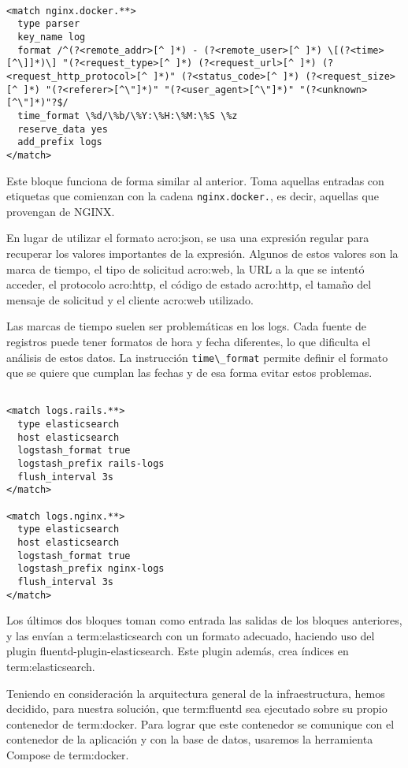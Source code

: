 \begin{lstlisting}

<match nginx.docker.**>
  type parser
  key_name log
  format /^(?<remote_addr>[^ ]*) - (?<remote_user>[^ ]*) \[(?<time>[^\]]*)\] "(?<request_type>[^ ]*) (?<request_url>[^ ]*) (?<request_http_protocol>[^ ]*)" (?<status_code>[^ ]*) (?<request_size>[^ ]*) "(?<referer>[^\"]*)" "(?<user_agent>[^\"]*)" "(?<unknown>[^\"]*)"?$/
  time_format \%d/\%b/\%Y:\%H:\%M:\%S \%z
  reserve_data yes
  add_prefix logs
</match>

\end{lstlisting}

Este bloque funciona de forma similar al anterior. Toma aquellas entradas con
etiquetas que comienzan con la cadena \lstinline{nginx.docker.}, es decir, aquellas que
provengan de NGINX.

En lugar de utilizar el formato \gls{acro:json}, se usa una expresión regular para
recuperar los valores importantes de la expresión. Algunos de estos valores son
la marca de tiempo, el tipo de solicitud \gls{acro:web}, la URL a la que se intentó
acceder, el protocolo \gls{acro:http}, el código de estado \gls{acro:http}, el tamaño del mensaje de
solicitud y el cliente \gls{acro:web} utilizado.

Las marcas de tiempo suelen ser problemáticas en los logs. Cada fuente de
registros puede tener formatos de hora y fecha diferentes, lo que dificulta el
análisis de estos datos. La instrucción \lstinline{time\_format} permite definir el formato
que se quiere que cumplan las fechas y de esa forma evitar estos problemas.

\begin{lstlisting}
 
<match logs.rails.**>
  type elasticsearch
  host elasticsearch
  logstash_format true
  logstash_prefix rails-logs
  flush_interval 3s
</match>

<match logs.nginx.**>
  type elasticsearch
  host elasticsearch
  logstash_format true
  logstash_prefix nginx-logs
  flush_interval 3s
</match>

\end{lstlisting}

Los últimos dos bloques toman como entrada las salidas de los bloques
anteriores, y las envían a \gls{term:elasticsearch} con un formato adecuado, haciendo uso
del plugin fluentd-plugin-elasticsearch. Este plugin además, crea índices en
\gls{term:elasticsearch}.

Teniendo en consideración la arquitectura general de la infraestructura, hemos
decidido, para nuestra solución, que \gls{term:fluentd} sea ejecutado sobre su propio
contenedor de \gls{term:docker}. Para lograr que este contenedor se comunique con el
contenedor de la aplicación y con la base de datos, usaremos la herramienta
Compose de \gls{term:docker}.

